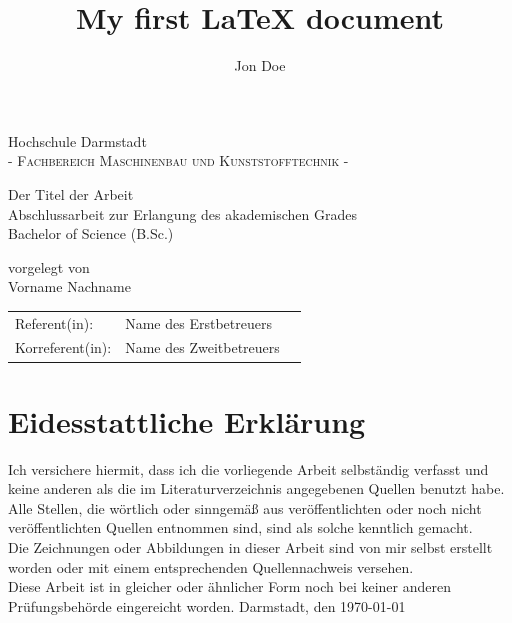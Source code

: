 \documentclass[a4paper,12pt]{article}
\title{My first \LaTeX{} document}
\author{Jon Doe}
\begin{document}
\newpage\null\thispagestyle{empty}\newpage
\newpage
\pagestyle{empty}


\begin{center}
\Large Hochschule Darmstadt \\
\normalsize \textsc{- Fachbereich Maschinenbau und Kunststofftechnik -} \\

\vfill

\Huge Der Titel der Arbeit \\
\normalsize
\vspace{12pt}
Abschlussarbeit zur Erlangung des akademischen Grades \\ 
Bachelor of Science (B.Sc.) 

\vfill

vorgelegt von \\
Vorname Nachname

\vfill

\begin{tabular}[h]{p{4cm}l l}
	Referent(in): & Name des Erstbetreuers\\
	Korreferent(in):  & Name des Zweitbetreuers
\end{tabular}

\end{center}

\newpage
\pagestyle{plain}
\section*{Eidesstattliche Erklärung}
Ich versichere hiermit, dass ich die vorliegende Arbeit selbständig verfasst und keine
anderen als die im Literaturverzeichnis angegebenen Quellen benutzt habe. \\

\noindent Alle Stellen, die wörtlich oder sinngemäß aus veröffentlichten oder noch nicht veröffentlichten
Quellen entnommen sind, sind als solche kenntlich gemacht. \\

\noindent Die Zeichnungen oder Abbildungen in dieser Arbeit sind von mir selbst erstellt worden oder mit
einem entsprechenden Quellennachweis versehen. \\

\noindent Diese Arbeit ist in gleicher oder ähnlicher Form noch bei keiner anderen Prüfungsbehörde
eingereicht worden.
\newline\newline
Darmstadt, den \today
\newpage
\end{document}
